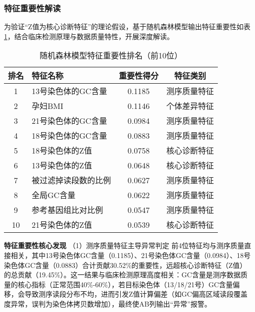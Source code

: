 \documentclass[withoutpreface,bwprint]{cumcmthesis} %
\begin{document}
\subsubsection{特征重要性解读}
为验证“Z值为核心诊断特征”的理论假设，基于随机森林模型输出特征重要性如表\ref{tab:随机森林模型特征排名}，结合临床检测原理与数据质量特性，开展深度解读。

\begin{table}[H]
    \centering  %
    \caption{随机森林模型特征重要性排名（前10位）}  %
    \label{tab:随机森林模型特征排名}  %
    \begin{threeparttable}
        \begin{tabularx}{0.75\textwidth}{c l c c}
            \toprule[1.5pt]
            \textbf{排名} & \textbf{特征名称} & \textbf{重要性得分} & \textbf{特征类别} \\ 
            \midrule[1pt]
            1    & 13号染色体的GC含量      & 0.1185     & 测序质量特征     \\
            2    & 孕妇BMI                 & 0.1146     & 个体差异特征     \\
            3    & 21号染色体的GC含量      & 0.0984     & 测序质量特征     \\
            4    & 18号染色体的GC含量      & 0.0883     & 测序质量特征     \\
            5    & 18号染色体的Z值         & 0.0758     & 核心诊断特征     \\
            6    & 13号染色体的Z值         & 0.0648     & 核心诊断特征     \\
            7    & 被过滤掉读段数的比例    & 0.0627     & 测序质量特征     \\
            8    & 全局GC含量              & 0.0622     & 测序质量特征     \\
            9    & 参考基因组比对比例      & 0.0547     & 测序质量特征     \\
            10   & 21号染色体的Z值         & 0.0539     & 核心诊断特征     \\

            \bottomrule[1.5pt]
        \end{tabularx}
    \end{threeparttable}
\end{table}


\textbf{特征重要性核心发现}
（1）测序质量特征主导异常判定
前4位特征均与测序质量直接相关，其中13号染色体GC含量（0.1185）、21号染色体GC含量（0.0984）、18号染色体GC含量（0.0883）合计贡献30.52\%的重要性，远超核心诊断特征（Z值）的总贡献（19.45\%）。这一结果与临床检测原理高度相关：GC含量是测序数据质量的核心指标（正常范围40\%-60\%），若目标染色体（13/18/21号）GC含量偏移，会导致测序读段分布不均，进而引发Z值计算偏差（如GC偏高区域读段覆盖度异常，误判为染色体拷贝数增加），最终使AB列输出“异常”报警。
\end{document}

